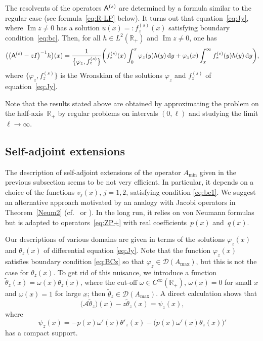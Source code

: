\documentclass[10pt,a4paper]{amsart}
\numberwithin{equation}{section}
\begin{document}
 The resolvents of the operators ${\sf A}^{(s)}$ are determined by a formula similar to the regular case (see formula~\eqref{eq:R-LP} below). It turns out that equation~\eqref{eq:Jy}, where $\operatorname{Im} z\neq 0$ has a solution $u(x)=: f^{(s)}_{z} (x)$ satisfying boundary condition~\eqref{eq:bc}. Then, for all $ h\in L^2 ({\mathbb R}_{+})$ and $ \operatorname{Im} z\neq 0$, one has
 \[
\big( \big({\sf A}^{(s)}-z I \big)^{-1} h\big) (x) = \frac{1}{\big\{\varphi_{z}, f^{(s)}_{z}\big\}} \bigg(f_{z}^{(s)}(x) \int_{0}^x \varphi_{z}(y) h (y) \,{\rm d} y+
 \varphi_{z}(x) \int_x^\infty f_{z}^{(s)}(y) h (y) \,{\rm d}y\bigg),
 \]
where $\big\{\varphi_{z}, f^{(s)}_{z}\big\}$ is the Wronskian of the solutions $\varphi_{z}$ and $ f^{(s)}_{z}$ of equation~\eqref{eq:Jy}.

 Note that the results stated above are obtained by approximating the problem on the half-axis~${\mathbb R}_{+}$ by regular problems on intervals $(0,\ell)$ and studying the limit $\ell\to\infty$.


\subsection{Self-adjoint extensions}\label{section2.4}

 The description of self-adjoint extensions of the operator $A_{\min}$ given in the previous subsection seems to be not very efficient. In particular, it depends on a choice of the functions $v_{j}(x)$, $j=1,2$, satisfying condition \eqref{eq:bc1}. We suggest an alternative approach motivated by an analogy with Jacobi operators in Theorem~\ref{Neum2} (cf.\ \cite[Lemma~6.22 and Theorem~6.23]{Schm} or \cite[Theorem~2.6]{Simon}). In the long run, it relies on von Neumann formulas but is adapted to operators~\eqref{eq:ZP+} with real coefficients~$p(x)$ and~$q(x)$.

Our descriptions of various domains are given in terms of the solutions $\varphi_{z}(x)$ and $\theta_{z}(x)$ of differential equation \eqref{eq:Jy}. Note that the function $\varphi_{z}(x)$ satisfies boundary condition \eqref{eq:BCz} so that $\varphi_{z} \in {\mathcal D}(A_{\max})$, but this is not the case for $\theta_{z}(x)$. To get rid of this nuisance, we introduce a function $\tilde{\theta}_z (x)= \omega(x) \theta_z (x)$, where the cut-off $\omega\in C^\infty ({\mathbb R}_{+})$, $\omega(x)=0$ for small $x$ and $\omega(x)=1$ for large $x$; then $\tilde\theta_{z} \in {\mathcal D}(A_{\max})$. A direct calculation shows that
 \begin{equation}
 \big( {\mathcal A}\tilde{\theta}_z \big)(x)-z\tilde{\theta}_z (x)=\psi_{z}(x),
 \label{eq:the}\end{equation}
 where
 \begin{equation}
 \psi_{z}(x)= -p(x) \omega'(x) \theta'_{z} (x) - \big(p(x) \omega'(x) \theta_{z} (x) \big)'
 \label{eq:the1}\end{equation}
 has a compact support.
\end{document}
